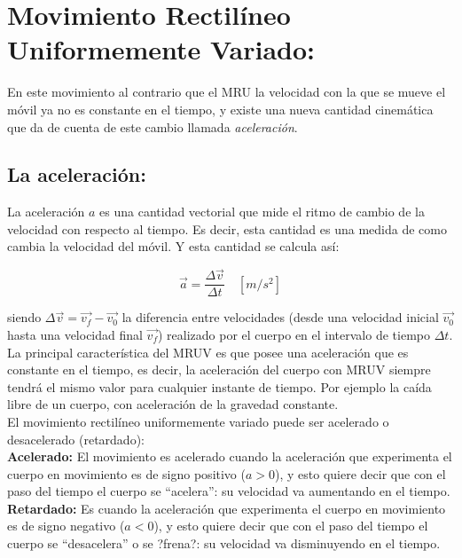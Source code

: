 \section{Movimiento Rectilíneo Uniformemente Variado:}
 
En este movimiento al contrario que el MRU la velocidad con la que se mueve el móvil ya no es constante en el tiempo, y existe 
una nueva cantidad cinemática que da de cuenta de este cambio llamada \textit{aceleración}. 

\subsection{La aceleración:}

La aceleración $a$ es una cantidad vectorial que mide el ritmo de cambio de la velocidad con respecto al tiempo. Es decir, esta 
cantidad es una medida de como cambia la velocidad del móvil. Y esta cantidad se calcula así:

\begin{equation}
 \vec{a}=\frac{\Delta \vec{v}}{\Delta t}\quad [m/s^2] 
 \end{equation}
 
siendo $\Delta \vec{v}=\vec{v_f}-\vec{v_0}$ la diferencia entre velocidades (desde una velocidad inicial $\vec{v_0}$ hasta una 
velocidad final $\vec{v_f}$) realizado por el cuerpo en el intervalo de tiempo $\Delta t$.\\

La principal característica del MRUV es que posee una aceleración que es constante en el tiempo, es decir, la aceleración del 
cuerpo con MRUV siempre tendrá el mismo valor para cualquier instante de tiempo. Por ejemplo la caída libre de un cuerpo, con 
aceleración de la gravedad constante.\\

El movimiento rectilíneo uniformemente variado puede ser acelerado o desacelerado (retardado):\\

\textbf{Acelerado:} El movimiento es acelerado cuando la aceleración que experimenta el cuerpo en movimiento es de signo positivo 
($a > 0$), y esto quiere decir que con el paso del tiempo el cuerpo se ``acelera'': su velocidad va aumentando en el tiempo.\\

\textbf{Retardado:} Es cuando la aceleración que experimenta el cuerpo en movimiento es de signo negativo ($a < 0$), y esto 
quiere decir que con el paso del tiempo el cuerpo se ``desacelera'' o se ?frena?: su velocidad va disminuyendo en el tiempo.\\

